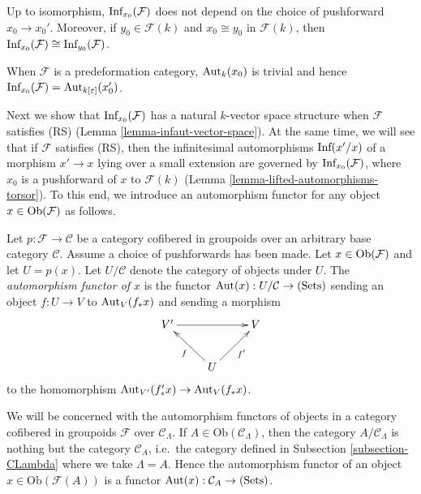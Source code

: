\begin{remark}
\label{remark-choice-pushforward-immaterial-infinitesimal-aut}
Up to isomorphism, $\textnormal{Inf}_{x_0}(\mathcal F)$ does not depend on the 
choice of pushforward $x_0 \rightarrow x_0'$.  Moreover, if $y_0 \in \mathcal 
F(k)$ and $x_0 \cong y_0$ in $\mathcal F(k)$, then 
$\textnormal{Inf}_{x_0}(\mathcal F) \cong \textnormal{Inf}_{y_0}(\mathcal F)$.
\end{remark}

\begin{remark}
\label{remark-trivial-aut-point}
When $\mathcal F$ is a predeformation category, $\textnormal{Aut}_{k}(x_0)$ is 
trivial and hence $\textnormal{Inf}_{x_0}(\mathcal F) = 
\textnormal{Aut}_{k[\varepsilon]}(x'_0)$.
\end{remark}

\noindent
Next we show that $\textnormal{Inf}_{x_0}(\mathcal F)$ has a natural $k$-vector 
space structure when $\mathcal F$ satisfies (RS) (Lemma 
\ref{lemma-infaut-vector-space}).  At the same time, we will see that if 
$\mathcal F$ satisfies (RS), then the infinitesimal automorphisms 
$\textnormal{Inf}(x'/x)$ of a morphism $x' \rightarrow x$ lying over a small 
extension are governed by $\textnormal{Inf}_{x_0}(\mathcal F)$, where $x_0$ is 
a pushforward of $x$ to $\mathcal F(k)$ (Lemma 
\ref{lemma-lifted-automorphisms-torsor}).  To this end, we introduce an 
automorphism functor for any object $x \in \textnormal{Ob}(\mathcal F)$ as 
follows.

\begin{definition}
\label{definition-automorphism-functor}
Let $p: \mathcal F \rightarrow \mathcal C$ be a category cofibered in groupoids 
over an arbitrary base category $\mathcal C$. Assume a choice of pushforwards 
has been made.  Let $x \in \textnormal{Ob}(\mathcal F)$ and let $U = p(x)$.  
Let $U/\mathcal C$ denote the category of objects under $U$. The 
{\it automorphism functor of $x$} is the functor $\textnormal{Aut}(x): 
U/\mathcal C \rightarrow \textnormal{(Sets)}$ sending an object $f: U 
\rightarrow V$ to $\textnormal{Aut}_{V}(f_*x)$ and sending a morphism
\[
\xymatrix{
V' \ar[rr] &                    & V\\
          & U \ar[ul]^{f}  \ar[ur]_{f'} & 
}
\]
to the homomorphism $\textnormal{Aut}_{V'}(f'_*x) \rightarrow 
\textnormal{Aut}_{V}(f_*x)$.
\end{definition}

\noindent 
We will be concerned with the automorphism functors of objects in a category 
cofibered in groupoids $\mathcal F$ over $\mathcal C_{\Lambda}$.  If $A \in 
\text{Ob}(\mathcal C_{\Lambda})$, then the category $A/\mathcal C_{\Lambda}$ is 
nothing but the category $\mathcal C_{A}$, i.e.\ the category defined in 
Subsection \ref{subsection-CLambda}
where we take $\Lambda = A$.  Hence the 
automorphism functor of an object $x \in \text{Ob}(\mathcal F(A))$ is a functor 
$\textnormal{Aut}(x): \mathcal C_{A} \rightarrow \textnormal{(Sets)}$.

